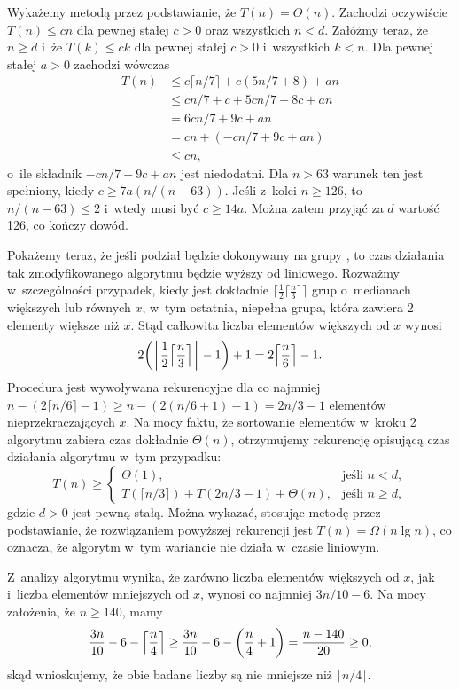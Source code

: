 Wykażemy metodą przez podstawianie, że $T(n)=O(n)$.
Zachodzi oczywiście $T(n)\le cn$ dla pewnej stałej $c>0$ oraz wszystkich $n<d$.
Załóżmy teraz, że $n\ge d$ i~że $T(k)\le ck$ dla pewnej stałej $c>0$ i~wszystkich $k<n$.
Dla pewnej stałej $a>0$ zachodzi wówczas
\begin{align*}
	T(n) &\le c\lceil n/7\rceil+c(5n/7+8)+an \\
	&\le cn/7+c+5cn/7+8c+an \\
	&= 6cn/7+9c+an \\
	&= cn+(-cn/7+9c+an) \\
	&\le cn,
\end{align*}
o~ile składnik $-cn/7+9c+an$ jest niedodatni.
Dla $n>63$ warunek ten jest spełniony, kiedy $c\ge7a(n/(n-63))$.
Jeśli z~kolei $n\ge126$, to $n/(n-63)\le2$ i~wtedy musi być $c\ge14a$.
Można zatem przyjąć za $d$ wartość 126, co kończy dowód.

Pokażemy teraz, że jeśli podział będzie dokonywany na grupy , to czas działania tak zmodyfikowanego algorytmu  będzie wyższy od liniowego.
Rozważmy w~szczególności przypadek, kiedy jest dokładnie $\bigl\lceil\frac{1}{2}\bigl\lceil\frac{n}{3}\bigr\rceil\bigr\rceil$ grup o~medianach większych lub równych $x$, w~tym ostatnia, niepełna grupa, która zawiera 2 elementy większe niż $x$.
Stąd całkowita liczba elementów większych od $x$ wynosi
\[
	2\biggl(\biggl\lceil\frac{1}{2}\Bigl\lceil\frac{n}{3}\Bigr\rceil\biggr\rceil-1\biggr)+1 = 2\Bigl\lceil\frac{n}{6}\Bigr\rceil-1.
\]
Procedura jest wywoływana rekurencyjne dla co najmniej $n-(2\lceil n/6\rceil-1)\ge n-(2(n/6+1)-1)=2n/3-1$ elementów nieprzekraczających $x$.
Na mocy faktu, że sortowanie elementów w~kroku 2 algorytmu  zabiera czas dokładnie $\Theta(n)$, otrzymujemy rekurencję opisującą czas działania algorytmu w~tym przypadku:
\[
	T(n) \ge \begin{cases}
		\Theta(1), & \text{jeśli $n<d$}, \\
		T(\lceil n/3\rceil)+T(2n/3-1)+\Theta(n), & \text{jeśli $n\ge d$},
	\end{cases}
\]
gdzie $d>0$ jest pewną stałą.
Można wykazać, stosując metodę przez podstawianie, że rozwiązaniem powyższej rekurencji jest $T(n)=\Omega(n\lg n)$, co oznacza, że algorytm w~tym wariancie nie działa w~czasie liniowym.

\exercise %
Z~analizy algorytmu  wynika, że zarówno liczba elementów większych od $x$, jak i~liczba elementów mniejszych od $x$, wynosi co najmniej $3n/10-6$.
Na mocy założenia, że $n\ge140$, mamy
\[
	\frac{3n}{10}-6-\Bigl\lceil\frac{n}{4}\Bigr\rceil \ge \frac{3n}{10}-6-\biggl(\frac{n}{4}+1\biggr) = \frac{n-140}{20} \ge 0,
\]
skąd wnioskujemy, że obie badane liczby są nie mniejsze niż $\lceil n/4\rceil$.

